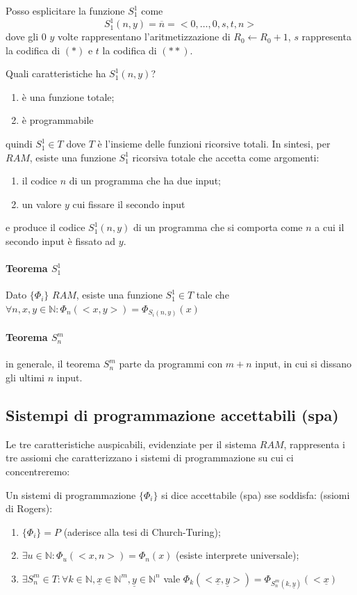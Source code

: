 \documentclass{article}
\begin{document}
    
Posso esplicitare la funzione $S_1^1$ come
\begin{displaymath}
	S_1^1(n,y)=\overline{n}=<0,\dots ,0, s, t,n>
\end{displaymath}
dove gli 0 $y$ volte rappresentano l'aritmetizzazione di $R_0 \leftarrow R_0+1$, $s$ rappresenta la codifica di $(*)$ e $t$ la codifica di $(**)$.




Quali caratteristiche ha $S_1^1(n,y)$?
\begin{enumerate}
	\item è una funzione totale;
	\item è programmabile
\end{enumerate}
quindi $S_1^1 \in T$ dove $T$ è l'insieme delle funzioni ricorsive totali.
In sintesi, per $RAM$, esiste una funzione $S_1^1$ ricorsiva totale che accetta come argomenti:
\begin{enumerate}
	\item il codice $n$ di un programma che ha due input;
	\item un valore $y$ cui fissare il secondo input
\end{enumerate}
e produce il codice $S_1^1(n,y)$ di un programma che si comporta come $n$ a cui il secondo input è fissato ad $y$.
\paragraph{Teorema $S_1^1$}
Dato $\{ \Phi_i \}$ $RAM$, esiste una funzione $S_1^1 \in T$ tale che $\forall n, x,y \in \mathbb{N}: \Phi_n(<x,y>)=\Phi_{S_i(n,y)}(x)$
\paragraph{Teorema $S_n^m$} in generale, il teorema $S_n^m$ parte da programmi con $m+n$ input, in cui si dissano gli ultimi $n$ input.

\subsection{Sistempi di programmazione accettabili (spa)}
Le tre caratteristiche auspicabili, evidenziate per il sistema $RAM$, rappresenta i tre assiomi che caratterizzano i sistemi di programmazione su cui ci concentreremo:


Un sistemi di programmazione $\{ \Phi_i \}$ si dice accettabile (spa) sse soddisfa: (ssiomi di Rogers):
\begin{enumerate}
	\item $\{ \Phi_i \}=P$ (aderisce alla tesi di Church-Turing);
	\item $\exists u \in \mathbb{N}: \Phi_u(<x,n>)=\Phi_n(x)$ (esiste interprete universale);
	\item $\exists  S_n^m \in T:\forall k \in \mathbb{N}, \underline{x} \in \mathbb{N}^m, \underline{y} \in \mathbb{N}^n$ vale $\Phi_k(<\underline{x},\underline{y}>)=\Phi_{S_n^m(k,\underline{y})}(<\underline{x})$
	
\end{enumerate} 
\end{document}
